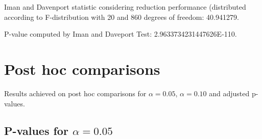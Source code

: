\documentclass[a4paper,10pt]{article}
\begin{document}
\begin{landscape}
Iman and Davenport statistic considering reduction performance (distributed according to F-distribution with 20 and 860 degrees of freedom: 40.941279.

P-value computed by Iman and Daveport Test: 2.9633734231447626E-110.\newline



\pagebreak

\section{Post hoc comparisons}

Results achieved on post hoc comparisons for $\alpha = 0.05$, $\alpha = 0.10$ and adjusted p-values.

\subsection{P-values for $\alpha=0.05$}


\end{landscape}
\end{document}
